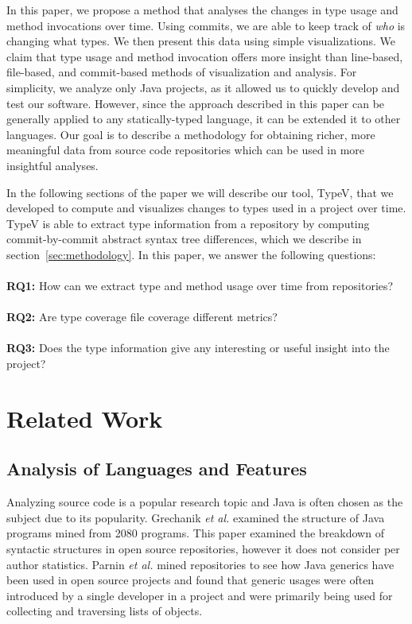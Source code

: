 In this paper, we propose a method that analyses the changes in type usage and method invocations over time. Using commits, we are able to keep track of \emph{who} is changing what types. We then present this data using simple visualizations. We claim that type usage and method invocation offers more insight than line-based, file-based, and commit-based methods of visualization and analysis. For simplicity, we analyze only Java projects, as it allowed us to quickly develop and test our software. However, since the approach described in this paper can be generally applied to any statically-typed language, it can be extended it to other languages. Our goal is to describe a methodology for obtaining richer, more meaningful data from source code repositories which can be used in more insightful analyses.

In the following sections of the paper we will describe our tool, TypeV, that we developed to compute and visualizes changes to types used in a project over time. TypeV is able to extract type information from a repository by computing commit-by-commit abstract syntax tree differences, which we describe in section~\ref{sec:methodology}. In this paper, we answer the following questions: \\ \\
\textbf{RQ1:} How can we extract type and method usage over time from repositories? \\ \\
\textbf{RQ2:} Are type coverage file coverage different metrics?
\\ \\
\textbf{RQ3:} Does the type information give any interesting or useful insight into the project? 

\section{Related Work}

\subsection{Analysis of Languages and Features}

Analyzing source code is a popular research topic and Java is often chosen as the subject due to its popularity. Grechanik \textit{et al.} \cite{Grechanik:2010:EIL:1852786.1852801} examined the structure of Java programs mined from 2080 programs. This paper examined the breakdown of syntactic structures in open source repositories, however it does not consider per author statistics. Parnin \textit{et al.} \cite{Parnin:2011:JGA:1985441.1985446} mined repositories to see how Java generics have been used in open source projects and found that generic usages were often introduced by a single developer in a project and were primarily being used for collecting and traversing lists of objects.

